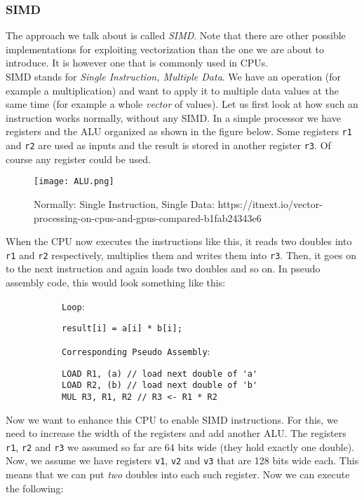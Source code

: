 \documentclass[main.tex]{subfiles}
\begin{document}
\subsubsection{SIMD}
The approach we talk about is called \textit{SIMD}. Note that there are other possible implementations for exploiting vectorization than the one we are about to introduce. It is however one that is commonly used in CPUs.\\
SIMD stands for \textit{Single Instruction, Multiple Data}. We have an operation (for example a multiplication) and want to apply it to multiple data values at the same time (for example a whole \textit{vector} of values). Let us first look at how such an instruction works normally, without any SIMD. In a simple processor we have registers and the ALU organized as shown in the figure below. Some registers \texttt{r1} and \texttt{r2} are used as inputs and the result is stored in another register \texttt{r3}. Of course any register could be used.
\begin{figure}[H]
    \centering
    \texttt{[image: ALU.png]}
    \caption{Normally: Single Instruction, Single Data: https://itnext.io/vector-processing-on-cpus-and-gpus-compared-b1fab24343e6}
\end{figure}
When the CPU now executes the instructions like this, it reads two doubles into \texttt{r1} and \texttt{r2} respectively, multiplies them and writes them into \texttt{r3}. Then, it goes on to the next instruction and again loads two doubles and so on. In pseudo assembly code, this would look something like this:
\begin{figure}[H]
    \begin{subfigure}[t]{.5\textwidth}
        \texttt{Loop}:
        \begin{verbatim}
result[i] = a[i] * b[i];
        \end{verbatim}
    \end{subfigure}%
    \begin{subfigure}[t]{.6\textwidth}
        \texttt{Corresponding Pseudo Assembly}:
        \begin{verbatim}
LOAD R1, (a) // load next double of 'a'
LOAD R2, (b) // load next double of 'b'
MUL R3, R1, R2 // R3 <- R1 * R2
        \end{verbatim}
    \end{subfigure}
\end{figure}
\noindent Now we want to enhance this CPU to enable SIMD instructions. For this, we need to increase the width of the registers and add another ALU. The registers \texttt{r1}, \texttt{r2} and \texttt{r3} we assumed so far are 64 bits wide (they hold exactly one double). Now, we assume we have registers \texttt{v1}, \texttt{v2} and \texttt{v3} that are 128 bits wide each. This means that we can put \textit{two} doubles into each such register. Now we can execute the following:
\end{document}
